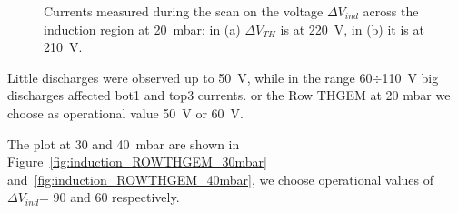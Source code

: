 \documentclass[a4paper, 11 pt]{report}
\newcommand{\Vind}{$\Delta V_{ind}$}
\newcommand{\Vthgem}{$\Delta V_{TH}$}
\begin{document}
\begin{figure}[!htb]
	\centering
	\caption{Currents measured during the scan on the voltage \Vind{} across the induction region at 
	20~mbar: in (a) \Vthgem{} is at 220~V, in (b) it is at 210~V.}
	\label{fig:induction_ROWTHGEM_20mbar_both}
\end{figure}
Little discharges were observed up to 50~V, while in the range 60$\div$110~V big discharges affected 
bot1 and top3 currents.  or the Row THGEM at 20 mbar we choose as operational value  50~V or 60~V.

The plot at 30 and 40~mbar are shown in Figure~\ref{fig:induction_ROWTHGEM_30mbar} and~\ref{fig:induction_ROWTHGEM_40mbar}, 
we choose operational values of \Vind= 90 and 60 respectively.
\end{document}
